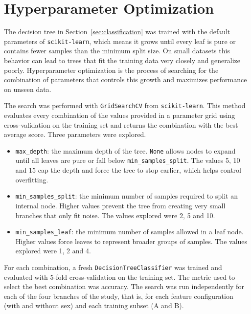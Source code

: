 \section{Hyperparameter Optimization}
\label{sec:hyperparameter_tuning}

The decision tree in Section~\ref{sec:classification} was trained with the default parameters of \texttt{scikit-learn}, which means it grows until every leaf is pure or contains fewer samples than the minimum split size. On small datasets this behavior can lead to trees that fit the training data very closely and generalize poorly. Hyperparameter optimization is the process of searching for the combination of parameters that controls this growth and maximizes performance on unseen data.

The search was performed with \texttt{GridSearchCV} from \texttt{scikit-learn}. This method evaluates every combination of the values provided in a parameter grid using cross-validation on the training set and returns the combination with the best average score. Three parameters were explored.

\begin{itemize}
	\item \texttt{max\_depth}: the maximum depth of the tree. \texttt{None} allows nodes to expand until all leaves are pure or fall below \texttt{min\_samples\_split}. The values 5, 10 and 15 cap the depth and force the tree to stop earlier, which helps control overfitting.
	\item \texttt{min\_samples\_split}: the minimum number of samples required to split an internal node. Higher values prevent the tree from creating very small branches that only fit noise. The values explored were 2, 5 and 10.
	\item \texttt{min\_samples\_leaf}: the minimum number of samples allowed in a leaf node. Higher values force leaves to represent broader groups of samples. The values explored were 1, 2 and 4.
\end{itemize}

For each combination, a fresh \texttt{DecisionTreeClassifier} was trained and evaluated with 5-fold cross-validation on the training set. The metric used to select the best combination was accuracy. The search was run independently for each of the four branches of the study, that is, for each feature configuration (with and without sex) and each training subset (A and B).


